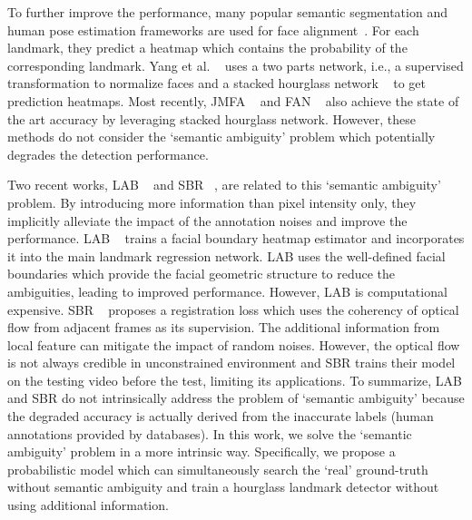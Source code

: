 \documentclass[10pt,twocolumn,letterpaper]{article}
\begin{document}
To further improve the performance, many popular semantic segmentation and human pose estimation frameworks are used for face alignment~\cite{Yang2017Stacked,Deng2017Joint, bulat2017far, merget2018robust}. For each landmark, they 
predict a heatmap which contains the probability of  the corresponding landmark. Yang et al. ~\cite{Yang2017Stacked} 
uses a two parts network, i.e., a supervised
transformation to normalize faces and a stacked hourglass network ~\cite{newell2016stacked} to get prediction heatmaps. 
Most recently, JMFA ~\cite{Deng2017Joint} and FAN ~\cite{bulat2017far} also achieve the state of the art accuracy by 
leveraging stacked hourglass network. 
However, these methods do not consider the `semantic ambiguity' problem which potentially degrades the detection performance.



{Two recent works, LAB ~\cite{wu2018look} and SBR ~\cite{dong2018supervision}, are  related to
	this `semantic ambiguity' problem. By introducing more information than pixel intensity only, they implicitly alleviate the impact of the 
	annotation noises and  improve the performance.}
LAB ~\cite{wu2018look} 
trains a facial boundary heatmap estimator and 
incorporates it into 
the main landmark regression network. 
{LAB uses the
well-defined facial 
	boundaries which 
{provide}
	the facial geometric structure to}
reduce the ambiguities, leading to improved performance. 
{However, LAB is computational expensive.}
SBR ~\cite{dong2018supervision} proposes a registration loss which 
uses the coherency of optical flow from adjacent frames as its supervision. The additional information from local feature can mitigate the impact of random noises. {However, the optical flow is not always {credible} in unconstrained environment and SBR  trains their model on the testing video before the test, limiting its applications.
} 
{To summarize, LAB and SBR do not intrinsically address the problem of `semantic ambiguity' because the degraded accuracy is actually derived from the inaccurate labels (human annotations provided by databases).
}
In this work, we solve the `semantic ambiguity' problem in a more intrinsic way. 
Specifically, 
we propose a probabilistic model which can simultaneously search the `real' ground-truth without 
semantic ambiguity and train a hourglass landmark detector without using additional information.
\end{document}
